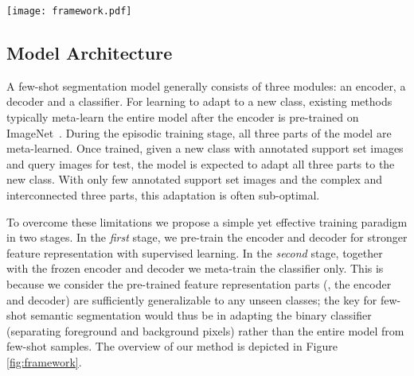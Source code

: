 \documentclass[10pt,twocolumn,letterpaper]{article}
\begin{document}
\begin{figure*}
    \centering
    \texttt{[image: framework.pdf]}
    \caption{Schematic overview of the proposed few-shot semantic segmentation method. 
    Our model is trained in two stages.
    In the {\em first} stage,
    we pre-train the encoder and decoder on the base classes in a standard supervised learning manner.
    In the {\em second} stage, given an episode
    we froze the encoder and decoder, 
    initialize the classifier on the support set,
    and meta-learn a Classifier Weight Transformer (CWT) to udpate the classifier for each
    query image.
    During meta-testing, the classifier is first trained on the support set, then updated by the frozen CWT to adapt to any query image,
    and finally applied to  that query image for segmentation.
    }
    \vspace{-0.4cm}
    \label{fig:framework}
\end{figure*}

\subsection{Model Architecture}

A few-shot segmentation model generally consists of three modules: an encoder, a decoder and a classifier.
For learning to adapt to a new class, existing methods typically meta-learn the entire model after 
the encoder is pre-trained on ImageNet~\cite{russakovsky2015imagenet}. During the episodic training stage, all three parts of the model are meta-learned. Once trained, given a new class with annotated support set images and query images for test, the model is expected to adapt all three parts to the new class. With only few annotated support set images and the complex and interconnected three parts, this adaptation is often sub-optimal. 


To overcome these limitations we propose a simple yet effective training paradigm in two stages.
In the {\em first} stage, we pre-train the encoder and decoder for stronger feature representation with supervised learning.
In the {\em second} stage, together with the frozen encoder and decoder we meta-train the classifier only.
This is because we consider the pre-trained feature representation parts (\ie, the encoder and decoder) are sufficiently generalizable to any unseen classes;
the key for few-shot semantic segmentation would thus be in adapting the binary classifier (separating foreground and background pixels) rather than the entire model from few-shot samples.
The overview of our method is depicted in Figure \ref{fig:framework}.
\end{document}
